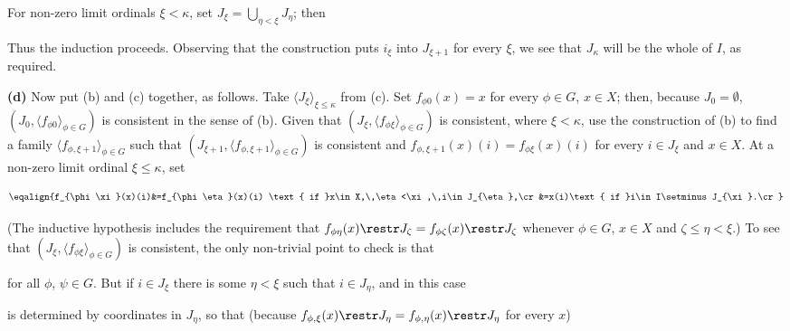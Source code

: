 {

\noindent For non-zero limit ordinals $\xi<\kappa$, set
$J_{\xi}=\bigcup_{\eta<\xi}J_{\eta}$;  then


\noindent Thus the induction proceeds.   Observing that the construction
puts $i_{\xi}$ into $J_{\xi+1}$ for every $\xi$, we see that
$J_{\kappa}$ will be the whole of $I$, as required.\ \Qed

\medskip

{\bf (d)} Now put (b) and (c) together, as follows.   Take
$\langle J_{\xi}\rangle_{\xi\le\kappa}$ from (c).   Set
$f_{\phi 0}(x)=x$ for every
$\phi\in G$, $x\in X$;  then, because $J_0=\emptyset$,
$(J_0,\langle f_{\phi 0}\rangle_{\phi\in G})$ is consistent in the sense
of (b).   Given that $(J_{\xi},\langle f_{\phi\xi}\rangle_{\phi\in G})$
is consistent, where $\xi<\kappa$, use the construction of (b) to find a
family $\langle f_{\phi,\xi+1}\rangle_{\phi\in G}$ such that
$(J_{\xi+1},\langle f_{\phi,\xi+1}\rangle_{\phi\in G})$ is consistent
and $f_{\phi,\xi+1}(x)(i)=f_{\phi\xi}(x)(i)$ for every $i\in J_{\xi}$ and
$x\in X$.   At a non-zero limit ordinal $\xi\le\kappa$, set

$$\eqalign{f_{\phi\xi}(x)(i)&=f_{\phi\eta}(x)(i)
  \text{ if }x\in X,\,\eta<\xi,\,i\in J_{\eta},\cr
&=x(i)\text{ if }i\in I\setminus J_{\xi}.\cr}$$

\noindent (The inductive hypothesis includes the requirement that
$f_{\phi\eta}(x)\restr J_{\zeta}=f_{\phi\zeta}(x)\restr J_{\zeta}$
whenever $\phi\in G$, $x\in X$ and $\zeta\le\eta<\xi$.)   To see that
$(J_{\xi},\langle f_{\phi\xi}\rangle_{\phi\in G})$
is consistent, the only non-trivial point to check is that


\noindent for all $\phi$, $\psi\in G$.   But if $i\in J_{\xi}$ there is
some $\eta<\xi$ such that $i\in J_{\eta}$, and in this case


\noindent is determined by coordinates in $J_{\eta}$, so that (because
$f_{\phi,\xi}(x)\restr J_{\eta}=f_{\phi,\eta}(x)\restr J_{\eta}$ for
every $x$)


}
